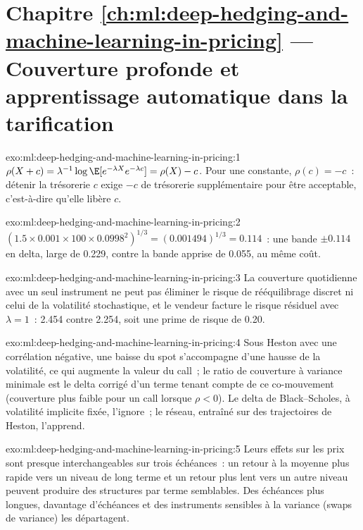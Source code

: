 \section*{Chapitre \ref{ch:ml:deep-hedging-and-machine-learning-in-pricing} --- Couverture profonde et apprentissage automatique dans la tarification}

\begin{solution}{exo:ml:deep-hedging-and-machine-learning-in-pricing:1}
$\rho(X + c) = \lambda^{-1}\log\E[e^{-\lambda X}e^{-\lambda c}] = \rho(X) - c$. Pour une constante, $\rho(c) = -c$~: détenir la trésorerie $c$
exige $-c$ de trésorerie supplémentaire pour être acceptable, c'est-à-dire qu'elle libère $c$.
\end{solution}

\begin{solution}{exo:ml:deep-hedging-and-machine-learning-in-pricing:2}
$(1.5\times0.001\times100\times0.0998^2)^{1/3} = (0.001494)^{1/3} = 0.114$~: une bande $\pm0.114$ en delta, large de 0.229, contre la
bande apprise de 0.055, au même coût.
\end{solution}

\begin{solution}{exo:ml:deep-hedging-and-machine-learning-in-pricing:3}
La couverture quotidienne avec un seul instrument ne peut pas éliminer le risque de rééquilibrage discret ni celui de la volatilité stochastique, et le vendeur
facture le risque résiduel avec $\lambda = 1$~: 2.454 contre 2.254, soit une prime de risque de 0.20.
\end{solution}

\begin{solution}{exo:ml:deep-hedging-and-machine-learning-in-pricing:4}
Sous Heston avec une corrélation négative, une baisse du spot s'accompagne d'une hausse de la volatilité, ce qui augmente la valeur du call~; le
ratio de couverture à variance minimale est le delta corrigé d'un terme tenant compte de ce co-mouvement (couverture plus faible pour un call lorsque $\rho <
0$). Le delta de Black--Scholes, à volatilité implicite fixée, l'ignore~; le réseau, entraîné sur des trajectoires de Heston, l'apprend.
\end{solution}

\begin{solution}{exo:ml:deep-hedging-and-machine-learning-in-pricing:5}
Leurs effets sur les prix sont presque interchangeables sur trois échéances~: un retour à la moyenne plus rapide vers un niveau de long terme et
un retour plus lent vers un autre niveau peuvent produire des structures par terme semblables. Des échéances plus longues, davantage d'échéances et
des instruments sensibles à la variance (swaps de variance) les départagent.
\end{solution}

